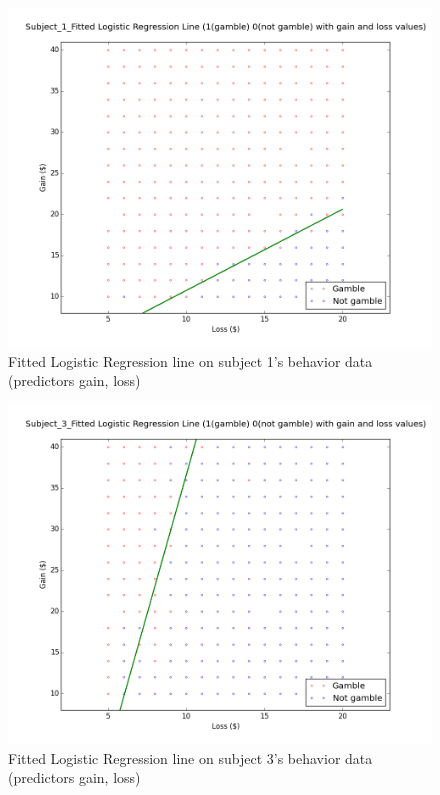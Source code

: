 \begin{figure}[H] 
\centering \includegraphics[scale=0.35]{../fig/log_reg_behav/log_regression_1.png}	 
\caption{Fitted Logistic Regression line on subject 1’s behavior data (predictors\: gain, loss)}
\end{figure} 

\begin{figure}[H] 
\centering \includegraphics[scale=0.35]{../fig/log_reg_behav/log_regression_3.png}	 
\caption{Fitted Logistic Regression line on subject 3’s behavior data (predictors\: gain, loss)}
\end{figure} 


